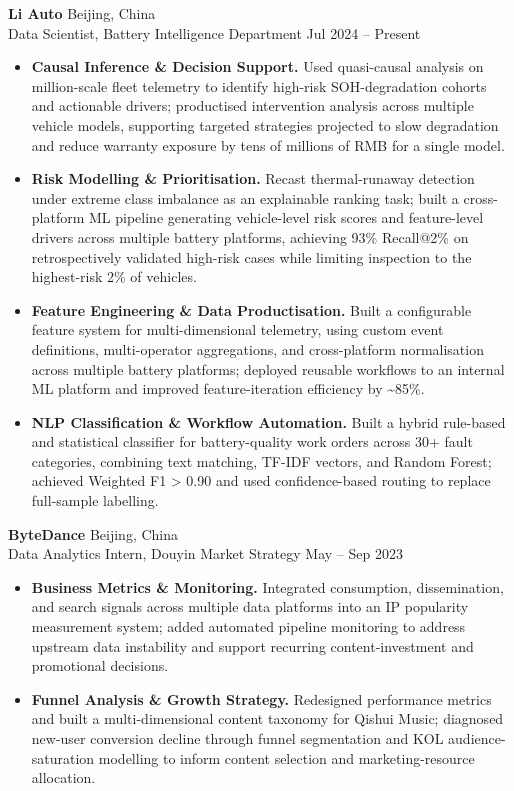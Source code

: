 \documentclass[a4paper,10pt]{article}
\begin{document}
\noindent\textbf{Li Auto} \hfill Beijing, China\\
Data Scientist, Battery Intelligence Department \hfill Jul 2024 -- Present
\begin{itemize}
    \item \textbf{Causal Inference \& Decision Support.} Used quasi-causal analysis on million-scale fleet telemetry to identify high-risk SOH-degradation cohorts and actionable drivers; productised intervention analysis across multiple vehicle models, supporting targeted strategies projected to slow degradation and reduce warranty exposure by tens of millions of RMB for a single model.

    \item \textbf{Risk Modelling \& Prioritisation.} Recast thermal-runaway detection under extreme class imbalance as an explainable ranking task; built a cross-platform ML pipeline generating vehicle-level risk scores and feature-level drivers across multiple battery platforms, achieving 93\% Recall@2\% on retrospectively validated high-risk cases while limiting inspection to the highest-risk 2\% of vehicles.

    \item \textbf{Feature Engineering \& Data Productisation.} Built a configurable feature system for multi-dimensional telemetry, using custom event definitions, multi-operator aggregations, and cross-platform normalisation across multiple battery platforms; deployed reusable workflows to an internal ML platform and improved feature-iteration efficiency by \textasciitilde85\%.

    \item \textbf{NLP Classification \& Workflow Automation.} Built a hybrid rule-based and statistical classifier for battery-quality work orders across 30+ fault categories, combining text matching, TF-IDF vectors, and Random Forest; achieved Weighted F1 > 0.90 and used confidence-based routing to replace full-sample labelling.
\end{itemize}

\vspace{2pt}
\noindent\textbf{ByteDance} \hfill Beijing, China\\
Data Analytics Intern, Douyin Market Strategy \hfill May -- Sep 2023
\begin{itemize}
    \item \textbf{Business Metrics \& Monitoring.} Integrated consumption, dissemination, and search signals across multiple data platforms into an IP popularity measurement system; added automated pipeline monitoring to address upstream data instability and support recurring content-investment and promotional decisions.

    \item \textbf{Funnel Analysis \& Growth Strategy.} Redesigned performance metrics and built a multi-dimensional content taxonomy for Qishui Music; diagnosed new-user conversion decline through funnel segmentation and KOL audience-saturation modelling to inform content selection and marketing-resource allocation.
\end{itemize}
\end{document}
